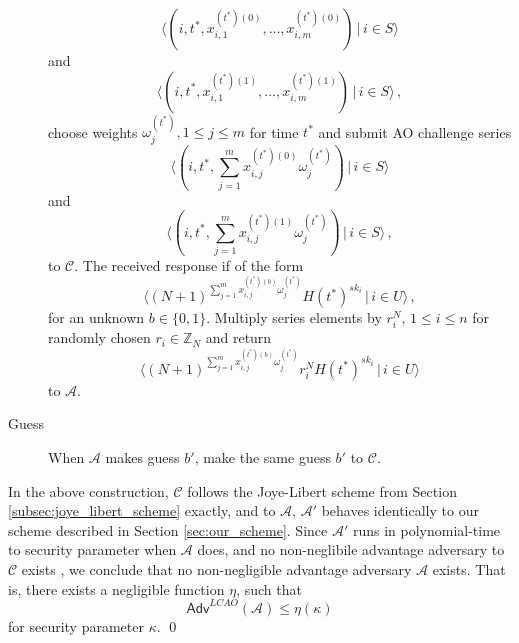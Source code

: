 \documentclass[twocolumn]{autart}
\begin{document}
\begin{pf}
\begin{description}
\begin{equation*}
            \langle(i,t^*,x^{(t^*)(0)}_{i,1},\dots,x^{(t^*)(0)}_{i,m})\,|\,i \in S\rangle
        \end{equation*}
        and
        \begin{equation*}
            \langle(i,t^*,x^{(t^*)(1)}_{i,1},\dots,x^{(t^*)(1)}_{i,m})\,|\, i \in S\rangle\,,
        \end{equation*}
        choose weights $\omega^{(t^*)}_j,1 \leq j \leq m$ for time $t^*$ and submit AO challenge series
        \begin{equation*}
            \langle(i,t^*,\sum^m_{j=1}x^{(t^*)(0)}_{i,j}\omega^{(t^*)}_j)\,|\,i \in S\rangle
        \end{equation*}
        and
        \begin{equation*}
            \langle(i,t^*,\sum^m_{j=1}x^{(t^*)(1)}_{i,j}\omega^{(t^*)}_j)\,|\,i \in S\rangle\,,
        \end{equation*}
        to $\mathcal{C}$. The received response if of the form 
        \begin{equation*}
            \langle(N+1)^{\sum^m_{j=1}x^{(t^*)(b)}_{i,j}\omega^{(t^*)}_j}H(t^*)^{sk_i}\,|\,i\in U\rangle\,,
        \end{equation*}
        for an unknown $b \in \{0,1\}$. Multiply series elements by $r_i^N,\,1 \leq i \leq n$ for randomly chosen $r_i \in \mathbb{Z}_N$ and return
        \begin{equation*}
            \langle(N+1)^{\sum^m_{j=1}x^{(t^*)(b)}_{i,j}\omega^{(t^*)}_j}r_i^N H(t^*)^{sk_i}\,|\,i\in U\rangle
        \end{equation*}
        to $\mathcal{A}$.
        \item[Guess] When $\mathcal{A}$ makes guess $b'$, make the same guess $b'$ to $\mathcal{C}$.
    \end{description}

    In the above construction, $\mathcal{C}$ follows the Joye-Libert scheme from Section \ref{subsec:joye_libert_scheme} exactly, and to $\mathcal{A}$, $\mathcal{A}'$ behaves identically to our scheme described in Section \ref{sec:our_scheme}. Since $\mathcal{A}'$ runs in polynomial-time to security parameter when $\mathcal{A}$ does, and no non-neglibile advantage adversary to $\mathcal{C}$ exists \cite{joyeScalableSchemePrivacyPreserving2013}, we conclude that no non-negligible advantage adversary $\mathcal{A}$ exists. That is, there exists a negligible function $\eta$, such that
    \begin{equation*}
        \mathsf{Adv}^{LCAO}(\mathcal{A}) \leq \eta(\kappa)
    \end{equation*}
    for security parameter $\kappa$. \qed
\end{pf}
\end{document}
